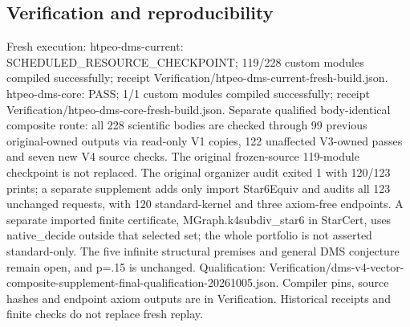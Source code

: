 \documentclass[11pt,a4paper]{article}
\begin{document}
\subsection{Verification and reproducibility}
Fresh execution: htpeo-dms-current: SCHEDULED\_RESOURCE\_CHECKPOINT; 119/228 custom modules compiled successfully; receipt Verification/htpeo-dms-current-fresh-build.json. htpeo-dms-core: PASS; 1/1 custom modules compiled successfully; receipt Verification/htpeo-dms-core-fresh-build.json. Separate qualified body-identical composite route: all 228 scientific bodies are checked through 99 previous original-owned outputs via read-only V1 copies, 122 unaffected V3-owned passes and seven new V4 source checks. The original frozen-source 119-module checkpoint is not replaced. The original organizer audit exited 1 with 120/123 prints; a separate supplement adds only import Star6Equiv and audits all 123 unchanged requests, with 120 standard-kernel and three axiom-free endpoints. A separate imported finite certificate, MGraph.k4subdiv\_star6 in StarCert, uses native\_decide outside that selected set; the whole portfolio is not asserted standard-only. The five infinite structural premises and general DMS conjecture remain open, and p=.15 is unchanged. Qualification: Verification/dms-v4-vector-composite-supplement-final-qualification-20261005.json. Compiler pins, source hashes and endpoint axiom outputs are in Verification. Historical receipts and finite checks do not replace fresh replay.
\end{document}
